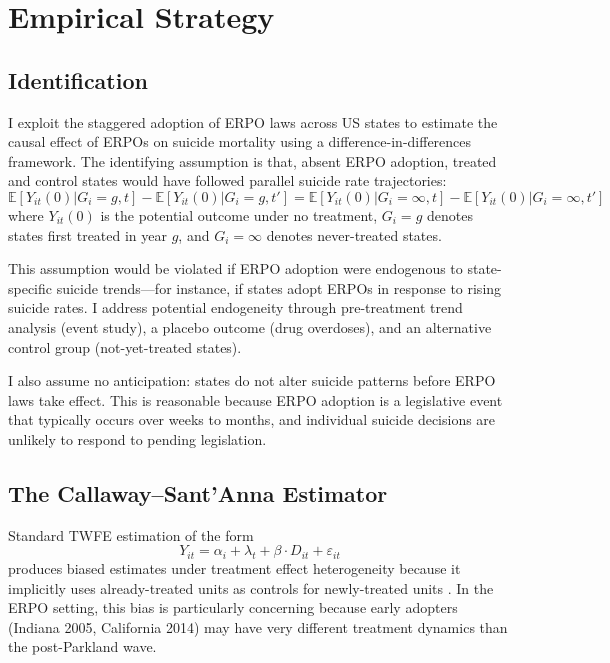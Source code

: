 \documentclass[12pt]{article}
\newcommand{\E}{\mathbb{E}}
\begin{document}



\section{Empirical Strategy}

\subsection{Identification}

I exploit the staggered adoption of ERPO laws across US states to estimate the causal effect of ERPOs on suicide mortality using a difference-in-differences framework. The identifying assumption is that, absent ERPO adoption, treated and control states would have followed parallel suicide rate trajectories:
\begin{equation}
\E[Y_{it}(0) | G_i = g, t] - \E[Y_{it}(0) | G_i = g, t'] = \E[Y_{it}(0) | G_i = \infty, t] - \E[Y_{it}(0) | G_i = \infty, t']
\end{equation}
where $Y_{it}(0)$ is the potential outcome under no treatment, $G_i = g$ denotes states first treated in year $g$, and $G_i = \infty$ denotes never-treated states.

This assumption would be violated if ERPO adoption were endogenous to state-specific suicide trends---for instance, if states adopt ERPOs in response to rising suicide rates. I address potential endogeneity through pre-treatment trend analysis (event study), a placebo outcome (drug overdoses), and an alternative control group (not-yet-treated states).

I also assume no anticipation: states do not alter suicide patterns before ERPO laws take effect. This is reasonable because ERPO adoption is a legislative event that typically occurs over weeks to months, and individual suicide decisions are unlikely to respond to pending legislation.

\subsection{The Callaway--Sant'Anna Estimator}

Standard TWFE estimation of the form
\begin{equation}
Y_{it} = \alpha_i + \lambda_t + \beta \cdot D_{it} + \varepsilon_{it}
\end{equation}
produces biased estimates under treatment effect heterogeneity because it implicitly uses already-treated units as controls for newly-treated units \citep{goodmanbacon2021difference, dechaisemartin2020two}. In the ERPO setting, this bias is particularly concerning because early adopters (Indiana 2005, California 2014) may have very different treatment dynamics than the post-Parkland wave.
\end{document}
